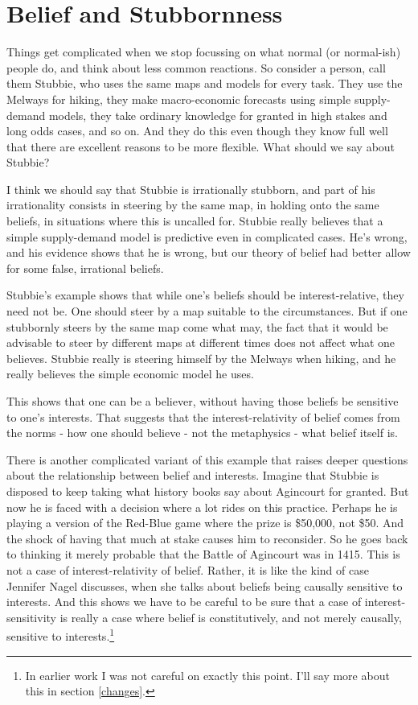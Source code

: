 \documentclass[
  11pt,
]{book}
\begin{document}
\hypertarget{stubbie}{%
\section{Belief and Stubbornness}\label{stubbie}}

Things get complicated when we stop focussing on what normal (or normal-ish) people do, and think about less common reactions. So consider a person, call them Stubbie, who uses the same maps and models for every task. They use the Melways for hiking, they make macro-economic forecasts using simple supply-demand models, they take ordinary knowledge for granted in high stakes and long odds cases, and so on. And they do this even though they know full well that there are excellent reasons to be more flexible. What should we say about Stubbie?

I think we should say that Stubbie is irrationally stubborn, and part of his irrationality consists in steering by the same map, in holding onto the same beliefs, in situations where this is uncalled for. Stubbie really believes that a simple supply-demand model is predictive even in complicated cases. He's wrong, and his evidence shows that he is wrong, but our theory of belief had better allow for some false, irrational beliefs.

Stubbie's example shows that while one's beliefs should be interest-relative, they need not be. One should steer by a map suitable to the circumstances. But if one stubbornly steers by the same map come what may, the fact that it would be advisable to steer by different maps at different times does not affect what one believes. Stubbie really is steering himself by the Melways when hiking, and he really believes the simple economic model he uses.

This shows that one can be a believer, without having those beliefs be sensitive to one's interests. That suggests that the interest-relativity of belief comes from the norms - how one should believe - not the metaphysics - what belief itself is.

There is another complicated variant of this example that raises deeper questions about the relationship between belief and interests. Imagine that Stubbie is disposed to keep taking what history books say about Agincourt for granted. But now he is faced with a decision where a lot rides on this practice. Perhaps he is playing a version of the Red-Blue game where the prize is \$50,000, not \$50. And the shock of having that much at stake causes him to reconsider. So he goes back to thinking it merely probable that the Battle of Agincourt was in 1415. This is not a case of interest-relativity of belief. Rather, it is like the kind of case Jennifer Nagel \citeyearpar{Nagel2010} discusses, when she talks about beliefs being causally sensitive to interests. And this shows we have to be careful to be sure that a case of interest-sensitivity is really a case where belief is constitutively, and not merely causally, sensitive to interests.\footnote{In earlier work I was not careful on exactly this point. I'll say more about this in section \ref{changes}.}
\end{document}

